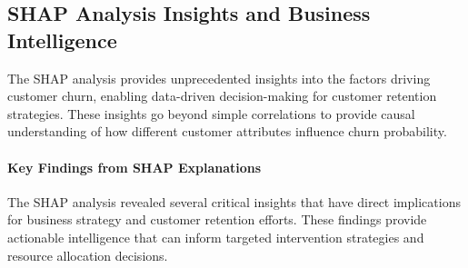 \documentclass{article}
\begin{document}
\subsection{SHAP Analysis Insights and Business Intelligence}

The SHAP analysis provides unprecedented insights into the factors driving customer churn, enabling data-driven decision-making for customer retention strategies. These insights go beyond simple correlations to provide causal understanding of how different customer attributes influence churn probability.

\paragraph{Key Findings from SHAP Explanations}

The SHAP analysis revealed several critical insights that have direct implications for business strategy and customer retention efforts. These findings provide actionable intelligence that can inform targeted intervention strategies and resource allocation decisions.
\end{document}
